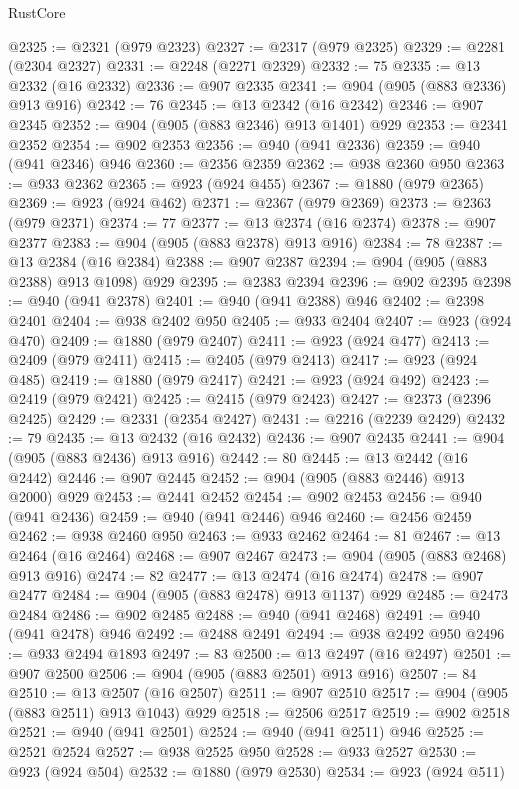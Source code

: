 \begin{lexlean}{RustCore}
\begin{coremodule}
@2325 := @2321 (@979 @2323)
@2327 := @2317 (@979 @2325)
@2329 := @2281 (@2304 @2327)
@2331 := @2248 (@2271 @2329)
@2332 := 75
@2335 := @13 @2332 (@16 @2332)
@2336 := @907 @2335
@2341 := @904 (@905 (@883 @2336) @913 @916)
@2342 := 76
@2345 := @13 @2342 (@16 @2342)
@2346 := @907 @2345
@2352 := @904 (@905 (@883 @2346) @913 @1401) @929
@2353 := @2341 @2352
@2354 := @902 @2353
@2356 := @940 (@941 @2336)
@2359 := @940 (@941 @2346) @946
@2360 := @2356 @2359
@2362 := @938 @2360 @950
@2363 := @933 @2362
@2365 := @923 (@924 @455)
@2367 := @1880 (@979 @2365)
@2369 := @923 (@924 @462)
@2371 := @2367 (@979 @2369)
@2373 := @2363 (@979 @2371)
@2374 := 77
@2377 := @13 @2374 (@16 @2374)
@2378 := @907 @2377
@2383 := @904 (@905 (@883 @2378) @913 @916)
@2384 := 78
@2387 := @13 @2384 (@16 @2384)
@2388 := @907 @2387
@2394 := @904 (@905 (@883 @2388) @913 @1098) @929
@2395 := @2383 @2394
@2396 := @902 @2395
@2398 := @940 (@941 @2378)
@2401 := @940 (@941 @2388) @946
@2402 := @2398 @2401
@2404 := @938 @2402 @950
@2405 := @933 @2404
@2407 := @923 (@924 @470)
@2409 := @1880 (@979 @2407)
@2411 := @923 (@924 @477)
@2413 := @2409 (@979 @2411)
@2415 := @2405 (@979 @2413)
@2417 := @923 (@924 @485)
@2419 := @1880 (@979 @2417)
@2421 := @923 (@924 @492)
@2423 := @2419 (@979 @2421)
@2425 := @2415 (@979 @2423)
@2427 := @2373 (@2396 @2425)
@2429 := @2331 (@2354 @2427)
@2431 := @2216 (@2239 @2429)
@2432 := 79
@2435 := @13 @2432 (@16 @2432)
@2436 := @907 @2435
@2441 := @904 (@905 (@883 @2436) @913 @916)
@2442 := 80
@2445 := @13 @2442 (@16 @2442)
@2446 := @907 @2445
@2452 := @904 (@905 (@883 @2446) @913 @2000) @929
@2453 := @2441 @2452
@2454 := @902 @2453
@2456 := @940 (@941 @2436)
@2459 := @940 (@941 @2446) @946
@2460 := @2456 @2459
@2462 := @938 @2460 @950
@2463 := @933 @2462
@2464 := 81
@2467 := @13 @2464 (@16 @2464)
@2468 := @907 @2467
@2473 := @904 (@905 (@883 @2468) @913 @916)
@2474 := 82
@2477 := @13 @2474 (@16 @2474)
@2478 := @907 @2477
@2484 := @904 (@905 (@883 @2478) @913 @1137) @929
@2485 := @2473 @2484
@2486 := @902 @2485
@2488 := @940 (@941 @2468)
@2491 := @940 (@941 @2478) @946
@2492 := @2488 @2491
@2494 := @938 @2492 @950
@2496 := @933 @2494 @1893
@2497 := 83
@2500 := @13 @2497 (@16 @2497)
@2501 := @907 @2500
@2506 := @904 (@905 (@883 @2501) @913 @916)
@2507 := 84
@2510 := @13 @2507 (@16 @2507)
@2511 := @907 @2510
@2517 := @904 (@905 (@883 @2511) @913 @1043) @929
@2518 := @2506 @2517
@2519 := @902 @2518
@2521 := @940 (@941 @2501)
@2524 := @940 (@941 @2511) @946
@2525 := @2521 @2524
@2527 := @938 @2525 @950
@2528 := @933 @2527
@2530 := @923 (@924 @504)
@2532 := @1880 (@979 @2530)
@2534 := @923 (@924 @511)

\end{coremodule}
\end{lexlean}

